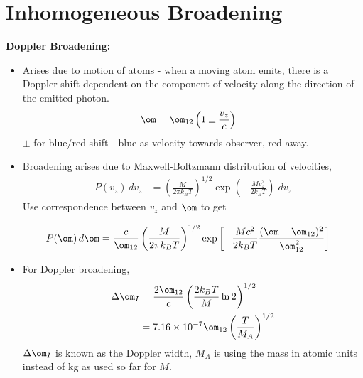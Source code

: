 \documentclass[a4paper, 11pt, normalem]{report}
\begin{document}
\section{Inhomogeneous Broadening}
\textbf{Doppler Broadening:}
\begin{itemize}
    \item Arises due to motion of atoms - when a moving atom emits, there is a Doppler shift dependent on the component of velocity along the direction of the emitted photon.
        \begin{align}
            \om &= \om_{12}\left(1 \pm \frac{v_z}{c}\right)
        \end{align} 
        $\pm$ for blue/red shift - blue as velocity towards observer, red away. 
    \item Broadening arises due to Maxwell-Boltzmann distribution of velocities,
        \begin{align}
            P(v_z)\,dv_z &= \left(\frac{M}{2\pi k_BT}\right)^{1/2} \exp\left(-\frac{Mv_z^2}{2k_BT}\right)\;dv_z
        \end{align}
        Use correspondence between $v_z$ and $\om$ to get
        \begin{figure}[H]
            \centering
        \end{figure}
        \begin{align}
            P(\om)\,d\om &= \frac{c}{\om_{12}}\left(\frac{M}{2\pi k_BT}\right)^{1/2}\exp\left[-\frac{Mc^2}{2k_B T}\frac{(\om-\om_{12})^2}{\om_{12}^2}\right]
        \end{align}
    \item For Doppler broadening, 
        \begin{align}
            \Delta\om_I &= \frac{2\om_{12}}{c}\left(\frac{2k_BT}{M}\ln2\right)^{1/2} \\
                        &= 7.16\times10^{-7}\om_{12}\left(\frac{T}{M_A}\right)^{1/2}
        \end{align}
        $\Delta\om_I$ is known as the Doppler width, $M_A$ is using the mass in atomic units instead of kg as used so far for $M$.
\end{itemize}
\end{document}
